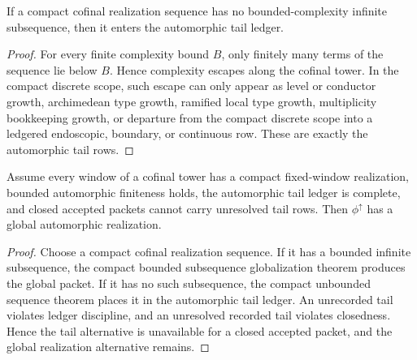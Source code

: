 \begin{theorem}
\label{thm:unified-reality-compact-unbounded-sequence-tail}
If a compact cofinal realization sequence has no bounded-complexity
infinite subsequence, then it enters the automorphic tail ledger.
\end{theorem}
\begin{proof}
For every finite complexity bound $B$, only finitely many terms of the
sequence lie below $B$. Hence complexity escapes along the cofinal
tower. In the compact discrete scope, such escape can only appear as
level or conductor growth, archimedean type growth, ramified local type
growth, multiplicity bookkeeping growth, or departure from the compact
discrete scope into a ledgered endoscopic, boundary, or continuous row.
These are exactly the automorphic tail rows.
\end{proof}

\begin{theorem}
\label{thm:unified-reality-compact-cofinal-window-closure}
Assume every window of a cofinal tower has a compact fixed-window
realization, bounded automorphic finiteness holds, the automorphic tail
ledger is complete, and closed accepted packets cannot carry unresolved
tail rows. Then $\phi^{\uparrow}$ has a global automorphic realization.
\end{theorem}
\begin{proof}
Choose a compact cofinal realization sequence. If it has a bounded
infinite subsequence, the compact bounded subsequence globalization
theorem produces the global packet. If it has no such subsequence, the
compact unbounded sequence theorem places it in the automorphic tail
ledger. An unrecorded tail violates ledger discipline, and an unresolved
recorded tail violates closedness. Hence the tail alternative is
unavailable for a closed accepted packet, and the global realization
alternative remains.
\end{proof}

